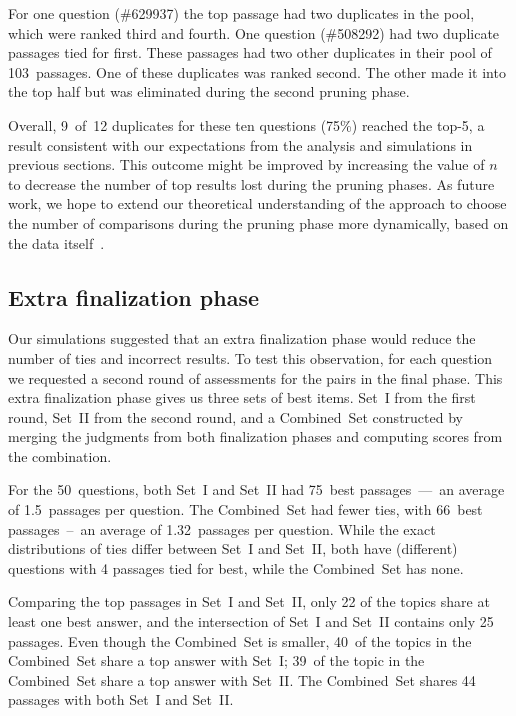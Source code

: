 For one question (\#629937) the top passage had two duplicates in the pool, which were ranked third and fourth. One question (\#508292) had two duplicate passages tied for first. These passages had two other duplicates in their pool of 103~passages. One of these duplicates was ranked second. The other made it into the top half but was eliminated during the second pruning phase.

Overall, 9~of~12 duplicates for these ten questions (75\%) reached the top-5, a result consistent with our expectations from the analysis and simulations in previous sections. This outcome might be improved by increasing the value of $n$ to decrease the number of top results lost during the pruning phases. As future work, we hope to extend our theoretical understanding of the approach to choose the number of comparisons during the pruning phase more dynamically, based on the data itself~\cite{karnin13}.

\subsection{Extra finalization phase}
\label{sec:final}

Our simulations suggested that an extra finalization phase would reduce the number of ties and incorrect results. To test this observation, for each question we requested a second round of assessments for the pairs in the final phase. This extra finalization phase gives us three sets of best items. Set~I from the first round, Set~II from the second round, and a Combined~Set constructed by merging the judgments from both finalization phases and computing scores from the combination.

For the 50~questions, both Set~I and Set~II had 75~best passages~---~an average of 1.5~passages per question. The Combined~Set had fewer ties, with 66~best passages~--~an average of 1.32~passages per question. While the exact distributions of ties differ between Set~I and Set~II, both have (different) questions with 4 passages tied for best, while the Combined~Set has none.

Comparing the top passages in Set~I and Set~II, only 22 of the topics share at least one best answer, and the intersection of Set~I and Set~II contains only 25 passages. Even though the Combined~Set is smaller, 40~of the topics in the Combined~Set share a top answer with Set~I; 39~of the topic in the Combined~Set share a top answer with Set~II. The Combined~Set shares 44 passages with both Set~I and Set~II.

